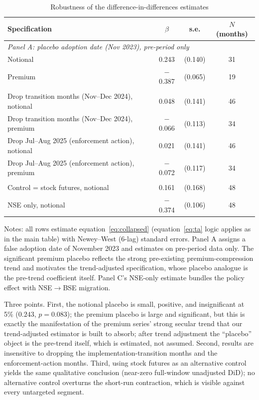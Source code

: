 \documentclass[12pt]{article}
\begin{document}
\begin{table}[H]
\centering
\caption{Robustness of the difference-in-differences estimates}
\label{tab:robust}
\small
\begin{threeparttable}
\begin{tabular}{lccc}
\toprule
Specification & $\beta$ & s.e. & $N$ (months) \\
\midrule
\multicolumn{4}{l}{\emph{Panel A: placebo adoption date (Nov 2023), pre-period only}}\\
\quad Notional & 0.243 & (0.140) & 31 \\
\quad Premium & $-$0.387 & (0.065) & 19 \\
\addlinespace
\multicolumn{4}{l}{\emph{Panel B: sample perturbations (full window, unadjusted)}}\\
\quad Drop transition months (Nov--Dec 2024), notional & 0.048 & (0.141) & 46 \\
\quad Drop transition months (Nov--Dec 2024), premium & $-$0.066 & (0.113) & 34 \\
\quad Drop Jul--Aug 2025 (enforcement action), notional & 0.021 & (0.141) & 46 \\
\quad Drop Jul--Aug 2025 (enforcement action), premium & $-$0.072 & (0.117) & 34 \\
\addlinespace
\multicolumn{4}{l}{\emph{Panel C: alternative control and venue}}\\
\quad Control = stock futures, notional & 0.161 & (0.168) & 48 \\
\quad NSE only, notional & $-$0.374 & (0.106) & 48 \\
\bottomrule
\end{tabular}
\begin{tablenotes}\footnotesize
\item Notes: all rows estimate equation~\eqref{eq:collapsed}
(equation~\eqref{eq:ta} logic applies as in the main table) with
Newey--West (6-lag) standard errors. Panel A assigns a false adoption date
of November 2023 and estimates on pre-period data only. The significant
premium placebo reflects the strong pre-existing premium-compression
trend and motivates the trend-adjusted specification, whose placebo
analogue is the pre-trend coefficient itself. Panel C's NSE-only estimate
bundles the policy effect with NSE$\rightarrow$BSE migration.
\end{tablenotes}
\end{threeparttable}
\end{table}

Three points. First, the notional placebo is small, positive, and
insignificant at 5\% ($0.243$, $p=0.083$); the premium placebo is large and
significant, but this is exactly the manifestation of the premium series'
strong secular trend that our trend-adjusted estimator is built to absorb;
after trend adjustment the ``placebo'' object is the pre-trend itself, which
is estimated, not assumed. Second, results are insensitive to dropping the
implementation-transition months and the enforcement-action months. Third,
using stock futures as an alternative control yields the same qualitative
conclusion (near-zero full-window unadjusted DiD); no alternative control
overturns the short-run contraction, which is visible against every
untargeted segment.
\end{document}
